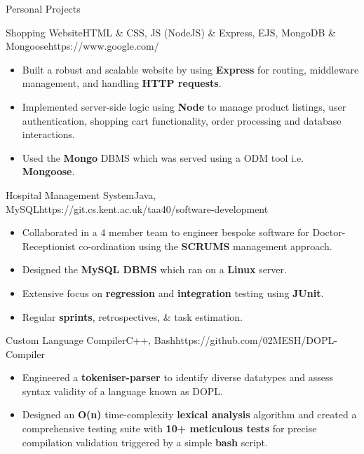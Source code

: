 \documentclass[11pt]{article}
\newlength{\secsep}
\newlength{\seperate}
\newcommand{\coloredhrulefill}[2][black]{%
    \leavevmode%
    \leaders\hbox{\textcolor{#1}{\rule{1ex}{0.5pt}}}\hfill\kern0pt%
}
\newcommand{\lineunder}{\vspace*{-24pt} \hspace*{-6pt} \coloredhrulefill[contactgrey]{}  \\* \vspace*{-15pt}}
\newenvironment{tabbedList}[1]{
	\begin{list}{}{
      \setlength{\itemsep}{0pt}
      \setlength{\labelsep}{0pt}
      \setlength{\labelwidth}{0pt}
      \setlength{\leftmargin}{10pt}
      \setlength{\rightmargin}{0pt}
      \setlength{\listparindent}{0pt}
      \setlength{\parsep}{0pt}
      \setlength{\parskip}{0pt}
      \setlength{\partopsep}{0pt}
      \setlength{\topsep}{#1}
	}
	\item[]
}{\end{list}}
\newenvironment{resume_section}[1] {
	\textsc{\Large #1} \\*
	
	\lineunder
	\begin{tabbedList}{\secsep}
}{\end{tabbedList}\vspace{1.2\secsep}}
\newenvironment{personal_projects}[4] {
	\textbf{#1} \href{#4}{#3} $\mid$ {\scriptsize #2}  %
	\vspace*{4px}
	\begin{tabbedList}{0pt}
}{\end{tabbedList}\vspace*{1.5\secsep}}
\newenvironment{subitems}{
	\vspace*{-2px}
	\begin{itemize}[left=2pt]
		\setlength{\labelsep}{0.3em}
		\setlength{\itemsep}{0pt}
		\setlength{\parsep}{0pt}
		\setlength{\topsep}{0px}
}{\end{itemize}}
\begin{document}
\begin{resume_section}{Personal Projects}
		\begin{personal_projects} {Shopping Website}{HTML \& CSS, JS (NodeJS) \& Express, EJS, MongoDB \& Mongoose}{\faGithub}{https://www.google.com/}
			\begin{subitems}
				\item{Built a robust and scalable website by using \textbf{Express} for routing, middleware management, and handling \textbf{HTTP requests}.}
				\item{Implemented server-side logic using \textbf{Node} to manage product listings, user authentication, shopping cart functionality, order processing and database interactions.}
				\item{Used the \textbf{Mongo} DBMS which was served using a ODM tool i.e. \textbf{Mongoose}.}
				\end{subitems}
			\end{personal_projects}
		
		\vspace*{\seperate}	
		
		\begin{personal_projects} {Hospital Management System}{Java, MySQL}{\faGitlab}{https://git.cs.kent.ac.uk/taa40/software-development}
			\begin{subitems}
				\item{Collaborated in a 4 member team to engineer bespoke software for Doctor-Receptionist co-ordination using the \textbf{SCRUMS} management approach.}
				\item{Designed the \textbf{MySQL DBMS} which ran on a \textbf{Linux} server.}
				\item{Extensive focus on \textbf{regression} and \textbf{integration} testing using \textbf{JUnit}.}
				\item{Regular \textbf{sprints}, retrospectives, \& task estimation.}
			\end{subitems}
		\end{personal_projects}		
		
		\begin{personal_projects} {Custom Language Compiler}{C++, Bash}{\faGithub}{https://github.com/02MESH/DOPL-Compiler}
			\begin{subitems}
				\item{Engineered a \textbf{tokeniser-parser} to identify diverse datatypes and assess syntax validity of a language known as DOPL.}
				\item{Designed an \textbf{O(n)} time-complexity \textbf{lexical analysis} algorithm and created a comprehensive testing suite with \textbf{10+ meticulous tests} for precise compilation validation triggered by a simple \textbf{bash} script.}
			\end{subitems}
		\end{personal_projects}
		

\end{resume_section}
\end{document}

